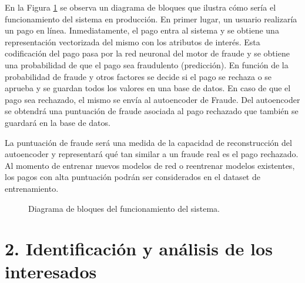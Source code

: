 \documentclass[
11pt, %
]{charter}
\begin{document}
En la Figura \ref{fig:esquemaSistema} se observa un diagrama de bloques que ilustra cómo sería el funcionamiento del sistema en producción. En primer lugar, un usuario realizaría un pago en línea. Inmediatamente, el pago entra al sistema y se obtiene una representación vectorizada del mismo con los atributos de interés. Esta codificación del pago pasa por la red neuronal del motor de fraude y se obtiene una probabilidad de que el pago sea fraudulento (predicción). En función de la probabilidad de fraude y otros factores se decide si el pago se rechaza o se aprueba y se guardan todos los valores en una base de datos. En caso de que el pago sea rechazado, el mismo se envía al autoencoder de Fraude. Del autoencoder se obtendrá una puntuación de fraude asociada al pago rechazado que también se guardará en la base de datos. 

La puntuación de fraude será una medida de la capacidad de reconstrucción del autoencoder y  representará qué tan similar a un fraude real es el pago rechazado. Al momento de entrenar nuevos modelos de red o reentrenar modelos existentes, los pagos con alta puntuación podrán ser considerados en el dataset de entrenamiento. 

\begin{figure}[htpb]
\centering
{}
\caption{Diagrama de bloques del funcionamiento del sistema.}
\label{fig:esquemaSistema}
\end{figure}

\section{2. Identificación y análisis de los interesados}
\label{sec:interesados}
\end{document}
